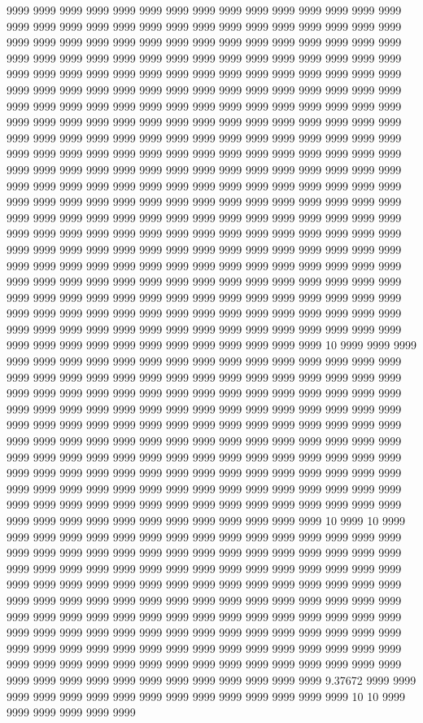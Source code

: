 9999 9999 9999 9999 9999 9999 9999 9999 9999 9999 9999 9999 9999 9999 9999 9999 9999 9999 9999 9999 9999 9999 9999 9999 9999 9999 9999 9999 9999 9999 9999 9999 9999 9999 9999 9999 9999 9999 9999 9999 9999 9999 9999 9999 9999 9999 9999 9999 9999 9999 9999 9999 9999 9999 9999 9999 9999 9999 9999 9999 9999 9999 9999 9999 9999 9999 9999 9999 9999 9999 9999 9999 9999 9999 9999 9999 9999 9999 9999 9999 9999 9999 9999 9999 9999 9999 9999 9999 9999 9999 9999 9999 9999 9999 9999 9999 9999 9999 9999 9999 9999 9999 9999 9999 9999 9999 9999 9999 9999 9999 9999 9999 9999 9999 9999 9999 9999 9999 9999 9999 9999 9999 9999 9999 9999 9999 9999 9999 9999 9999 9999 9999 9999 9999 9999 9999 9999 9999 9999 9999 9999 9999 9999 9999 9999 9999 9999 9999 9999 9999 9999 9999 9999 9999 9999 9999 9999 9999 9999 9999 9999 9999 9999 9999 9999 9999 9999 9999 9999 9999 9999 9999 9999 9999 9999 9999 9999 9999 9999 9999 9999 9999 9999 9999 9999 9999 9999 9999 9999 9999 9999 9999 9999 9999 9999 9999 9999 9999 9999 9999 9999 9999 9999 9999 9999 9999 9999 9999 9999 9999 9999 9999 9999 9999 9999 9999 9999 9999 9999 9999 9999 9999 9999 9999 9999 9999 9999 9999 9999 9999 9999 9999 9999 9999 9999 9999 9999 9999 9999 9999 9999 9999 9999 9999 9999 9999 9999 9999 9999 9999 9999 9999 9999 9999 9999 9999 9999 9999 9999 9999 9999 9999 9999 9999 9999 9999 9999 9999 9999 9999 9999 9999 9999 9999 9999 9999 9999 9999 9999 9999 9999 9999 9999 9999 9999 9999 9999 9999 9999 9999 9999 9999 9999 9999 9999 9999 9999 9999 9999 9999 9999 9999 9999 9999 9999 9999 9999 9999 9999 9999 9999 9999 9999 9999 9999 9999 9999 9999 9999 9999 9999 9999 9999 9999 9999 9999 9999 10 9999 9999 9999 9999 9999 9999 9999 9999 9999 9999 9999 9999 9999 9999 9999 9999 9999 9999 9999 9999 9999 9999 9999 9999 9999 9999 9999 9999 9999 9999 9999 9999 9999 9999 9999 9999 9999 9999 9999 9999 9999 9999 9999 9999 9999 9999 9999 9999 9999 9999 9999 9999 9999 9999 9999 9999 9999 9999 9999 9999 9999 9999 9999 9999 9999 9999 9999 9999 9999 9999 9999 9999 9999 9999 9999 9999 9999 9999 9999 9999 9999 9999 9999 9999 9999 9999 9999 9999 9999 9999 9999 9999 9999 9999 9999 9999 9999 9999 9999 9999 9999 9999 9999 9999 9999 9999 9999 9999 9999 9999 9999 9999 9999 9999 9999 9999 9999 9999 9999 9999 9999 9999 9999 9999 9999 9999 9999 9999 9999 9999 9999 9999 9999 9999 9999 9999 9999 9999 9999 9999 9999 9999 9999 9999 9999 9999 9999 9999 9999 9999 9999 9999 9999 9999 9999 9999 9999 9999 9999 9999 9999 9999 9999 9999 9999 10 9999 10 9999 9999 9999 9999 9999 9999 9999 9999 9999 9999 9999 9999 9999 9999 9999 9999 9999 9999 9999 9999 9999 9999 9999 9999 9999 9999 9999 9999 9999 9999 9999 9999 9999 9999 9999 9999 9999 9999 9999 9999 9999 9999 9999 9999 9999 9999 9999 9999 9999 9999 9999 9999 9999 9999 9999 9999 9999 9999 9999 9999 9999 9999 9999 9999 9999 9999 9999 9999 9999 9999 9999 9999 9999 9999 9999 9999 9999 9999 9999 9999 9999 9999 9999 9999 9999 9999 9999 9999 9999 9999 9999 9999 9999 9999 9999 9999 9999 9999 9999 9999 9999 9999 9999 9999 9999 9999 9999 9999 9999 9999 9999 9999 9999 9999 9999 9999 9999 9999 9999 9999 9999 9999 9999 9999 9999 9999 9999 9999 9999 9999 9999 9999 9999 9999 9999 9999 9999 9999 9999 9999 9999 9999 9999 9999 9999 9999 9999 9999 9.37672 9999 9999 9999 9999 9999 9999 9999 9999 9999 9999 9999 9999 9999 9999 9999 10 10 9999 9999 9999 9999 9999 9999 